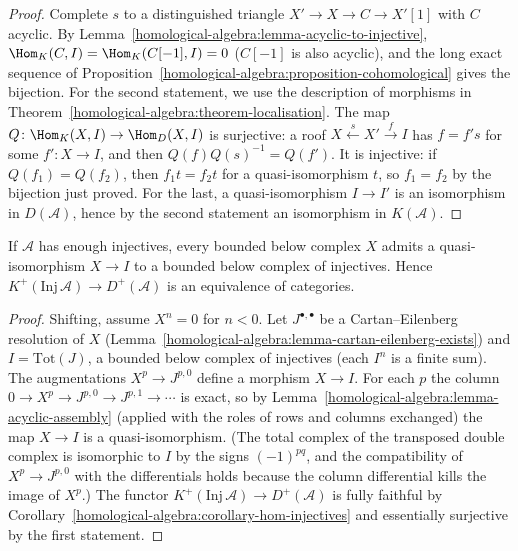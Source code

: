 \begin{proof}
Complete $s$ to a distinguished triangle $X' \to X \to C \to X'[1]$ with $C$ acyclic. By Lemma~\ref{homological-algebra:lemma-acyclic-to-injective},
$\Hom_K(C, I) = \Hom_K(C[-1], I) = 0$ ($C[-1]$ is also acyclic), and the long exact sequence of
Proposition~\ref{homological-algebra:proposition-cohomological} gives the bijection. For the second statement, we use the description of morphisms in
Theorem~\ref{homological-algebra:theorem-localisation}. The map $Q \colon \Hom_K(X, I) \to \Hom_D(X, I)$ is surjective: a roof
$X \xleftarrow{s} X' \xrightarrow{f} I$ has $f = f's$ for some $f' \colon X \to I$, and then $Q(f)Q(s)^{-1} = Q(f')$. It is injective: if $Q(f_1) = Q(f_2)$,
then $f_1t = f_2t$ for a quasi-isomorphism $t$, so $f_1 = f_2$ by the bijection just proved. For the last, a quasi-isomorphism $I \to I'$ is an isomorphism in
$D(\mathcal{A})$, hence by the second statement an isomorphism in $K(\mathcal{A})$.
\end{proof}

\begin{proposition}\label{homological-algebra:proposition-resolutions-complexes}
If $\mathcal{A}$ has enough injectives, every bounded below complex $X$ admits a quasi-isomorphism $X \to I$ to a bounded below complex of
injectives. Hence $K^+(\mathrm{Inj}\,\mathcal{A}) \to D^+(\mathcal{A})$ is an equivalence of categories.
\end{proposition}

\begin{proof}
Shifting, assume $X^n = 0$ for $n < 0$. Let $J^{\bullet,\bullet}$ be a Cartan--Eilenberg resolution of $X$
(Lemma~\ref{homological-algebra:lemma-cartan-eilenberg-exists}) and $I = \mathrm{Tot}(J)$, a bounded below complex of injectives (each $I^n$ is a
finite sum). The augmentations $X^p \to J^{p,0}$ define a morphism $X \to I$. For each $p$ the column $0 \to X^p \to J^{p,0} \to J^{p,1} \to \cdots$ is
exact, so by Lemma~\ref{homological-algebra:lemma-acyclic-assembly} (applied with the roles of rows and columns exchanged) the map
$X \to I$ is a quasi-isomorphism. (The total complex of the transposed double complex is isomorphic to $I$ by the signs $(-1)^{pq}$, and the
compatibility of $X^p \to J^{p,0}$ with the differentials holds because the column differential kills the image of $X^p$.) The functor $K^+(\mathrm{Inj}\,\mathcal{A}) \to D^+(\mathcal{A})$ is fully faithful by
Corollary~\ref{homological-algebra:corollary-hom-injectives} and essentially surjective by the first statement.
\end{proof}

